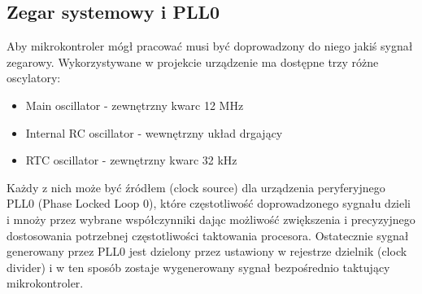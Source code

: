 \subsection{Zegar systemowy i PLL0}

Aby mikrokontroler mógł pracować musi być doprowadzony do niego jakiś sygnał zegarowy. Wykorzystywane w projekcie urządzenie ma dostępne trzy różne oscylatory:
\begin{itemize}
    \item Main oscillator - zewnętrzny kwarc 12 MHz
    \item Internal RC oscillator - wewnętrzny układ drgający
    \item RTC oscillator - zewnętrzny kwarc 32 kHz
\end{itemize}
Każdy z nich może być źródłem (clock source) dla urządzenia peryferyjnego PLL0 (Phase Locked Loop 0), które częstotliwość doprowadzonego sygnału dzieli i mnoży przez wybrane współczynniki dając możliwość zwiększenia i precyzyjnego dostosowania potrzebnej częstotliwości taktowania procesora. Ostatecznie sygnał generowany przez PLL0 jest dzielony przez ustawiony w rejestrze dzielnik (clock divider) i w ten sposób zostaje wygenerowany sygnał bezpośrednio taktujący mikrokontroler.

